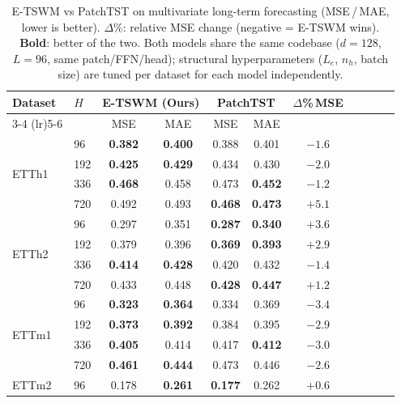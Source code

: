 \documentclass[conference]{IEEEtran}
\begin{document}
\begin{table}[t]
    \centering
    \caption{E-TSWM vs PatchTST on multivariate long-term forecasting (MSE\,/\,MAE, lower is better). $\Delta$\%: relative MSE change (negative = E-TSWM wins). \textbf{Bold}: better of the two. Both models share the same codebase ($d{=}128$, $L{=}96$, same patch/FFN/head); structural hyperparameters ($L_e$, $n_h$, batch size) are tuned per dataset for each model independently.}
    \label{tab:main}
    \vspace{-1mm}
    {\footnotesize
    \begin{tabular}{ll cccc cccc c}
        \toprule
        \multirow{2}{*}{Dataset} & \multirow{2}{*}{$H$} & \multicolumn{2}{c}{\textbf{E-TSWM (Ours)}} & \multicolumn{2}{c}{PatchTST \cite{b_patchtst}} & \multirow{2}{*}{$\Delta$\%\,MSE} \\
        \cmidrule(lr){3-4} \cmidrule(lr){5-6}
        & & MSE & MAE & MSE & MAE & \\
        \midrule
        \multirow{4}{*}{ETTh1}
        & 96  & \textbf{0.382} & \textbf{0.400} & 0.388 & 0.401 & $-1.6$ \\
        & 192 & \textbf{0.425} & \textbf{0.429} & 0.434 & 0.430 & $-2.0$ \\
        & 336 & \textbf{0.468} & 0.458 & 0.473 & \textbf{0.452} & $-1.2$ \\
        & 720 & 0.492 & 0.493 & \textbf{0.468} & \textbf{0.473} & $+5.1$ \\
        \midrule
        \multirow{4}{*}{ETTh2}
        & 96  & 0.297 & 0.351 & \textbf{0.287} & \textbf{0.340} & $+3.6$ \\
        & 192 & 0.379 & 0.396 & \textbf{0.369} & \textbf{0.393} & $+2.9$ \\
        & 336 & \textbf{0.414} & \textbf{0.428} & 0.420 & 0.432 & $-1.4$ \\
        & 720 & 0.433 & 0.448 & \textbf{0.428} & \textbf{0.447} & $+1.2$ \\
        \midrule
        \multirow{4}{*}{ETTm1}
        & 96  & \textbf{0.323} & \textbf{0.364} & 0.334 & 0.369 & $-3.4$ \\
        & 192 & \textbf{0.373} & \textbf{0.392} & 0.384 & 0.395 & $-2.9$ \\
        & 336 & \textbf{0.405} & 0.414 & 0.417 & \textbf{0.412} & $-3.0$ \\
        & 720 & \textbf{0.461} & \textbf{0.444} & 0.473 & 0.446 & $-2.6$ \\
        \midrule
        \multirow{4}{*}{ETTm2}
        & 96  & 0.178 & \textbf{0.261} & \textbf{0.177} & 0.262 & $+0.6$ \\

\end{tabular}}
\end{table}
\end{document}
